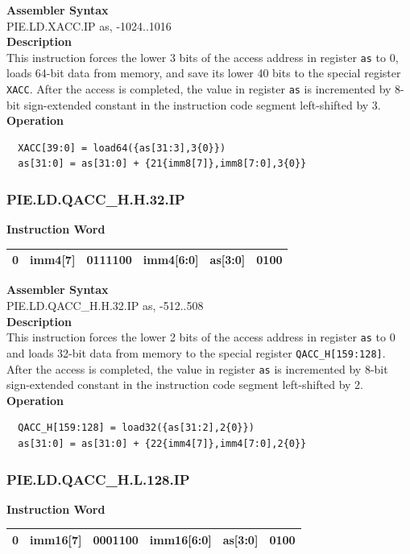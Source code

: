 \textbf{Assembler Syntax} \\
PIE.LD.XACC.IP as, -1024..1016 \\
\textbf{Description} \\
This instruction forces the lower 3 bits of the access address in register \lstinline{as} to 0, loads 64-bit data from memory, and save its lower 40 bits to the special register \lstinline{XACC}. After the access is completed, the value in register \lstinline{as} is incremented by 8-bit sign-extended constant in the instruction code segment left-shifted by 3.\\
\textbf{Operation}
\begin{lstlisting}
  XACC[39:0] = load64({as[31:3],3{0}})
  as[31:0] = as[31:0] + {21{imm8[7]},imm8[7:0],3{0}}
\end{lstlisting}

\newpage
\subsubsection{PIE.LD.QACC\_H.H.32.IP}\label{instruction:PIELDQACCHH32IP}
\setlength\tabcolsep{6pt}
\textbf{Instruction Word} \\
\begin{tabular}{|c|c|c|c|c|c|}
	\hline
	0 & imm4[7] & 0111100 & imm4[6:0] & as[3:0] & 0100 \\
	\hline
\end{tabular}

\textbf{Assembler Syntax} \\
PIE.LD.QACC\_H.H.32.IP as, -512..508 \\
\textbf{Description} \\
This instruction forces the lower 2 bits of the access address in register \lstinline{as} to 0 and loads 32-bit data from memory to the special register \lstinline{QACC_H[159:128]}. After the access is completed, the value in register \lstinline{as} is incremented by 8-bit sign-extended constant in the instruction code segment left-shifted by 2.\\
\textbf{Operation}
\begin{lstlisting}
  QACC_H[159:128] = load32({as[31:2],2{0}})
  as[31:0] = as[31:0] + {22{imm4[7]},imm4[7:0],2{0}}
\end{lstlisting}

\newpage
\subsubsection{PIE.LD.QACC\_H.L.128.IP}\label{instruction:PIELDQACCHL128IP}
\setlength\tabcolsep{6pt}
\textbf{Instruction Word} \\
\begin{tabular}{|c|c|c|c|c|c|}
	\hline
	0 & imm16[7] & 0001100 & imm16[6:0] & as[3:0] & 0100 \\
	\hline
\end{tabular}

